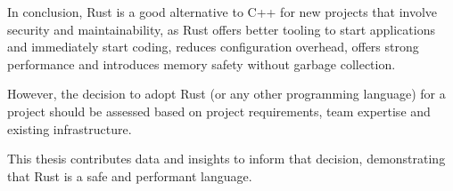 \documentclass[11pt,
               a4paper,
               bibtotoc,
               idxtotoc,
               headsepline,
               footsepline,
               footexclude,
               BCOR12mm,
               DIV13,
               openany,   %
               ]
               {scrbook}
\begin{document}
In conclusion, Rust is a good alternative to C++ for new projects that involve security and maintainability, as Rust offers better tooling to start applications and immediately start coding, reduces configuration overhead, offers strong performance and introduces memory safety without garbage collection.

However, the decision to adopt Rust (or any other programming language) for a project should be assessed based on project requirements, team expertise and existing infrastructure.

This thesis contributes data and insights to inform that decision, demonstrating that Rust is a safe and performant language.







\end{document}
